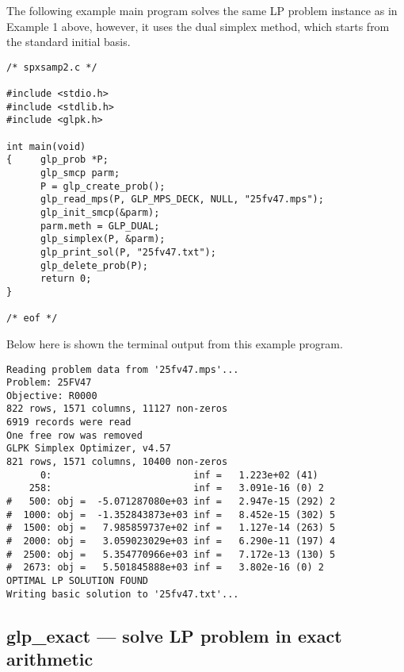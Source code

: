 \newpage


The following example main program solves the same LP problem instance
as in Example 1 above, however, it uses the dual simplex method, which
starts from the standard initial basis.

\begin{footnotesize}
\begin{verbatim}
/* spxsamp2.c */

#include <stdio.h>
#include <stdlib.h>
#include <glpk.h>

int main(void)
{     glp_prob *P;
      glp_smcp parm;
      P = glp_create_prob();
      glp_read_mps(P, GLP_MPS_DECK, NULL, "25fv47.mps");
      glp_init_smcp(&parm);
      parm.meth = GLP_DUAL;
      glp_simplex(P, &parm);
      glp_print_sol(P, "25fv47.txt");
      glp_delete_prob(P);
      return 0;
}

/* eof */
\end{verbatim}
\end{footnotesize}

Below here is shown the terminal output from this example program.

\begin{footnotesize}
\begin{verbatim}
Reading problem data from '25fv47.mps'...
Problem: 25FV47
Objective: R0000
822 rows, 1571 columns, 11127 non-zeros
6919 records were read
One free row was removed
GLPK Simplex Optimizer, v4.57
821 rows, 1571 columns, 10400 non-zeros
      0:                         inf =   1.223e+02 (41)
    258:                         inf =   3.091e-16 (0) 2
#   500: obj =  -5.071287080e+03 inf =   2.947e-15 (292) 2
#  1000: obj =  -1.352843873e+03 inf =   8.452e-15 (302) 5
#  1500: obj =   7.985859737e+02 inf =   1.127e-14 (263) 5
#  2000: obj =   3.059023029e+03 inf =   6.290e-11 (197) 4
#  2500: obj =   5.354770966e+03 inf =   7.172e-13 (130) 5
#  2673: obj =   5.501845888e+03 inf =   3.802e-16 (0) 2
OPTIMAL LP SOLUTION FOUND
Writing basic solution to '25fv47.txt'...
\end{verbatim}
\end{footnotesize}

\newpage

\subsection{glp\_exact --- solve LP problem in exact arithmetic}

\synopsis

